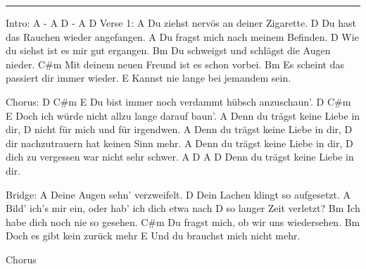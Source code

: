 \noindent\rule{\columnwidth}{1pt}

\begin{multicols}{2}
\begin{lstsong}
Intro: A - A D - A D
Verse 1:
   A
Du ziehst nervös an deiner Zigarette.
    D
Du hast das Rauchen wieder angefangen.
    A
Du fragst mich nach meinem Befinden.
 D
Wie du siehst ist es mir gut ergangen.
    Bm
Du schweigst und schlägst die Augen nieder. 
    C#m
Mit deinem neuen Freund ist es schon vorbei. 
    Bm
Es scheint das passiert dir immer wieder. 
E
Kannst nie lange bei jemandem sein.

Chorus:
    D                 C#m              E
Du bist immer noch verdammt hübsch anzuschaun'.
     D                      C#m          E
Doch ich würde nicht allzu lange darauf baun'.
      A
Denn du trägst keine Liebe in dir, 
D
nicht für mich und für irgendwen. 
     A
Denn du trägst keine Liebe in dir, 
    D
dir nachzutrauern hat keinen Sinn mehr. 
     A
Denn du trägst keine Liebe in dir, 
     D
dich zu vergessen war nicht sehr schwer. 
     A                        D      A     D
Denn du trägst keine Liebe in dir.
\end{lstsong}
\columnbreak
\begin{lstsong}
Bridge:
A
Deine Augen sehn' verzweifelt.
      D
Dein Lachen klingt so aufgesetzt. 
A
Bild' ich's mir ein, oder hab' ich dich etwa nach 
D
so langer Zeit verletzt? 
    Bm
Ich habe dich noch nie so gesehen. 
C#m
Du fragst mich, ob wir uns wiedersehen. 
        Bm
Doch es gibt kein zurück mehr 
    E
Und du brauchst mich nicht mehr.

Chorus
\end{lstsong}
\end{multicols}
\newpage
